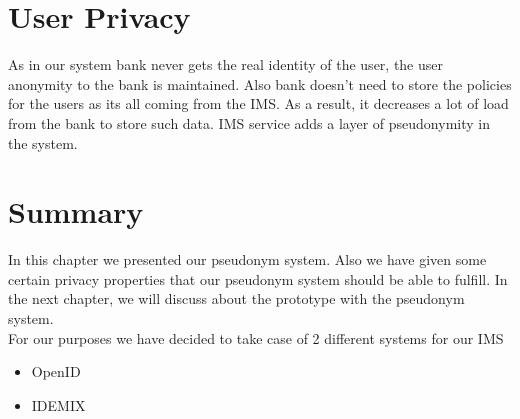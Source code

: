 \section{User Privacy}
As in our system bank never gets the real identity of the user, the user anonymity to the bank is maintained. Also bank doesn't need to store the policies for the users as its all coming from the IMS. As a result, it decreases a lot of load from the bank to store such data. IMS service adds a layer of pseudonymity in the system. 

\section{Summary}
In this chapter we presented our pseudonym system. Also we have given some certain privacy properties that our pseudonym system should be able to fulfill. In the next chapter, we will discuss about the prototype with the pseudonym system.
\\For our purposes we have decided to take case of 2 different systems for our IMS
\begin{itemize}
	\item OpenID
	\item IDEMIX
\end{itemize}